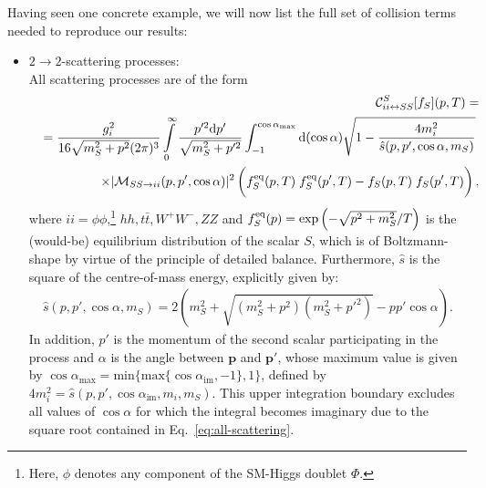 Having seen one concrete example, we will now list the full set of collision terms needed to reproduce our results:
\begin{itemize}

\item $2 \rightarrow 2$-scattering processes:\\

All scattering processes are of the form
\begin{eqnarray}
&&\mathcal{C}^S_{ii \leftrightarrow SS}[f_S] (p,T)= \label{eq:all-scattering}\\
&&= \frac{g_i^2}{16 \sqrt{m_S^2 + p^2} (2 \pi)^3} \int\limits_0^\infty \frac{p'^2 \mathrm{d}p' }{\sqrt{m_S^2 + p'^2}}\int_{-1}^{\cos\alpha_\text{max}}\mathrm{d}(\cos\alpha) \sqrt{ 1 - \frac{4 m_i^2}{\hat s(p,p',\cos\alpha,m_S)}} \;\nonumber\\
&&\times |\mathcal{M}_{SS \rightarrow ii}(p,p',\cos\alpha)|^2 \left(\vphantom{\frac{ f_S^{\rm eq}(p,T)}{ 1}} f_S^\mathrm{eq}(p,T) \; f_S^\mathrm{eq}(p',T) - f_S(p,T) \; f_S(p',T) \right),\nonumber
\end{eqnarray}
where $ii = \phi\phi$,\footnote{Here, $\phi$ denotes any component of the SM-Higgs doublet $\Phi$.} $hh, t\bar{t}, W^+W^-, ZZ$ and $f_S^{\rm eq}(p) = \exp \left( -\sqrt{p^2 + m_S^2}/T \right)$ is the (would-be) equilibrium distribution of the scalar $S$, which is of Boltzmann-shape by virtue of the principle of detailed balance. Furthermore, $\hat s$ is the square of the centre-of-mass energy, explicitly given by:
\begin{align}
\hat s(p,p',\cos\alpha,m_S) = 2 ( m_S^2 + \sqrt{ ( m_S^2 + p^2 ) ( m_S^2 + p'^2 ) } - p p' \cos\alpha ).
\end{align}
In addition, $p'$ is the momentum of the second scalar participating in the process and $\alpha$ is the angle between $\mathbf{p}$ and $\mathbf{p'}$, whose maximum value is given by $\cos\alpha_\text{max} = \text{min}\{\text{max}\{ \cos\alpha_\text{im}, -1 \}, 1 \}$, defined by $4 m_i^2 = \hat s(p,p',\cos\alpha_\text{im},m_i,m_S)$. This upper integration boundary excludes all values of $\cos\alpha$ for which the integral becomes imaginary due to the square root contained in Eq.~\eqref{eq:all-scattering}.


\end{itemize}
